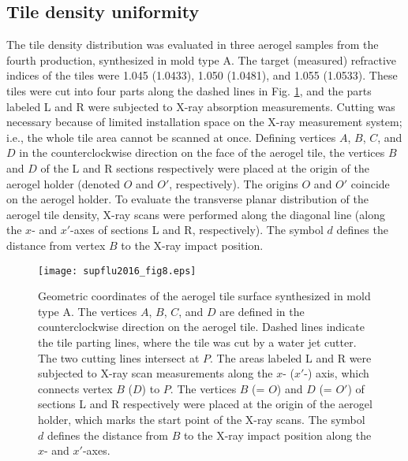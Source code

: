 \documentclass[5p,twocolumn]{elsarticle}
\begin{document}
\subsection{Tile density uniformity}
\label{5-3}

The tile density distribution was evaluated in three aerogel samples from the fourth production, synthesized in mold type A. The target (measured) refractive indices of the tiles were 1.045 (1.0433), 1.050 (1.0481), and 1.055 (1.0533). These tiles were cut into four parts along the dashed lines in Fig. \ref{fig:fig8}, and the parts labeled L and R were subjected to X-ray absorption measurements. Cutting was necessary because of limited installation space on the X-ray measurement system; i.e., the whole tile area cannot be scanned at once. Defining vertices $A$, $B$, $C$, and $D$ in the counterclockwise direction on the face of the aerogel tile, the vertices $B$ and $D$ of the L and R sections respectively were placed at the origin of the aerogel holder (denoted $O$ and $O'$, respectively). The origins $O$ and $O'$ coincide on the aerogel holder. To evaluate the transverse planar distribution of the aerogel tile density, X-ray scans were performed along the diagonal line (along the $x$- and $x'$-axes of sections L and R, respectively). The symbol $d$ defines the distance from vertex $B$ to the X-ray impact position.

\begin{figure}[t]
\centering 
\texttt{[image: supflu2016\_fig8.eps]}
\caption{Geometric coordinates of the aerogel tile surface synthesized in mold type A. The vertices $A$, $B$, $C$, and $D$ are defined in the counterclockwise direction on the aerogel tile. Dashed lines indicate the tile parting lines, where the tile was cut by a water jet cutter. The two cutting lines intersect at $P$. The areas labeled L and R were subjected to X-ray scan measurements along the $x$- ($x'$-) axis, which connects vertex $B$ ($D$) to $P$. The vertices $B$ (= $O$) and $D$ (= $O'$) of sections L and R respectively were placed at the origin of the aerogel holder, which marks the start point of the X-ray scans. The symbol $d$ defines the distance from $B$ to the X-ray impact position along the $x$- and $x'$-axes.}
\label{fig:fig8}
\end{figure}
\end{document}
